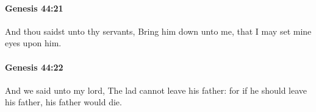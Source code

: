 		\paragraph{Genesis 44:21} %
			\label{GENESIS-44-21}

			And thou saidst unto thy servants, Bring him down unto me, that I may set mine eyes upon him.


		\paragraph{Genesis 44:22} %
			\label{GENESIS-44-22}

			And we said unto my lord, The lad cannot leave his father: for if he should leave his father, his father would die.



